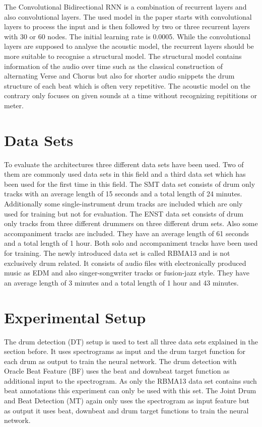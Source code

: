 \documentclass[11pt,twocolumn]{article}
\begin{document}
The Convolutional Bidirectional RNN is a combination of recurrent layers and also convolutional layers. The used model in the paper starts with convolutional layers to process the input and is then followed by two or three recurrent layers with 30 or 60 nodes. The initial learning rate is 0.0005. While the convolutional layers are supposed to analyse the acoustic model, the recurrent layers should be more suitable to recognise a structural model.\newline
The structural model  contains information of the audio over time such as the classical construction of alternating Verse and Chorus but also for shorter audio snippets the drum structure of each beat which is often very repetitive. The acoustic model on the contrary only focuses on given sounds at a time without recognizing repititions or meter.

\section*{Data Sets}

To evaluate the architectures three different data sets have been used. Two of them are commonly used data sets in this field and a third data set which has been used for the first time in this field.\newline
The SMT data set consists of drum only tracks with an average length of 15 seconds and a total length of 24 minutes. Additionally some single-instrument drum tracks are included which are only used for training but not for evaluation.\newline
The ENST data set consists of drum only tracks from three different drummers on three different drum sets. Also some accompaniment tracks are included. They have an average length of 61 seconds and a total length of 1 hour. Both solo and accompaniment tracks have been used for training.\newline
The newly introduced data set is called RBMA13 and is not exclusively drum related. It consists of audio files with electronically produced music as EDM and also singer-songwriter tracks or fusion-jazz style. They have an average length of 3 minutes and a total length of 1 hour and 43 minutes.

\section*{Experimental Setup}

The drum detection (DT) setup is used to test all three data sets explained in the section before.\newline
It uses spectrograms as input and the drum target function for each drum as output to train the neural network.\newline
The drum detection with Oracle Beat Feature (BF) uses the beat and downbeat target function as additional input to the spectrogram. As only the RBMA13 data set contains such beat annotations this experiment can only be used with this set.\newline
The Joint Drum and Beat Detection (MT) again only uses the spectrogram as input feature but as output it uses beat, downbeat and drum target functions to train the neural network.
\end{document}
